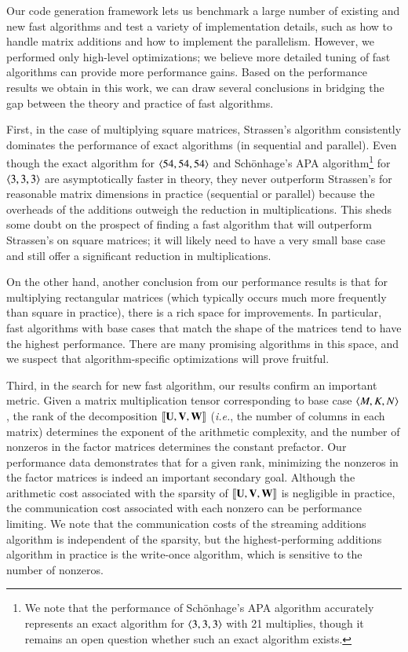 \documentclass[preprint]{sigplanconf}
\newcommand{\M}[2][]{{\bm{#1\mathbf{\MakeUppercase{#2}}}}}
\begin{document}
Our code generation framework lets us benchmark a large number of existing and new fast algorithms and test a variety of implementation details, such as how to handle matrix additions and how to implement the parallelism.
However, we performed only high-level optimizations; we believe more detailed tuning of fast algorithms can provide more performance gains.
Based on the performance results we obtain in this work, we can draw several conclusions in bridging the gap between the theory and practice of fast algorithms. 

First, in the case of multiplying square matrices, Strassen's algorithm consistently dominates the performance of exact algorithms (in sequential and parallel).
Even though the exact algorithm for $\left\langle54, 54, 54\right\rangle$ and Sch\"{o}nhage's APA algorithm\footnote{We note that the performance of Sch\"{o}nhage's APA algorithm accurately represents an exact algorithm for $\left\langle3, 3, 3\right\rangle$ with 21 multiplies, though it remains an open question whether such an exact algorithm exists.} for $\left\langle3, 3, 3\right\rangle$ are asymptotically faster in theory, they never outperform Strassen's for reasonable matrix dimensions in practice (sequential or parallel) because the overheads of the additions outweigh the reduction in multiplications.
This sheds some doubt on the prospect of finding a fast algorithm that will outperform Strassen's on square matrices; it will likely need to have a very small base case and still offer a significant reduction in multiplications.

On the other hand, another conclusion from our performance results is that for multiplying rectangular matrices (which typically occurs much more frequently than square in practice), there is a rich space for improvements.
In particular, fast algorithms with base cases that match the shape of the matrices tend to have the highest performance.
There are many promising algorithms in this space, and we suspect that algorithm-specific optimizations will prove fruitful.

Third, in the search for new fast algorithm, our results confirm an important metric.
Given a matrix multiplication tensor corresponding to base case $\left\langle M, K, N\right\rangle$, the rank of the decomposition $\alg{\M{U}}{\M{V}}{\M{W}}$ (\emph{i.e.}, the number of columns in each matrix) determines the exponent of the arithmetic complexity, and the number of nonzeros in the factor matrices determines the constant prefactor.
Our performance data demonstrates that for a given rank, minimizing the nonzeros in the factor matrices is indeed an important secondary goal.
Although the arithmetic cost associated with the sparsity of $\alg{\M{U}}{\M{V}}{\M{W}}$ is negligible in practice, the communication cost associated with each nonzero can be performance limiting.
We note that the communication costs of the streaming additions algorithm is independent of the sparsity, but the highest-performing additions algorithm in practice is the write-once algorithm, which is sensitive to the number of nonzeros.
\end{document}
